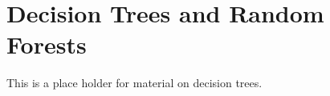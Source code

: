 
\chapter{Decision Trees and Random Forests}

This is a place holder for material on decision trees.
